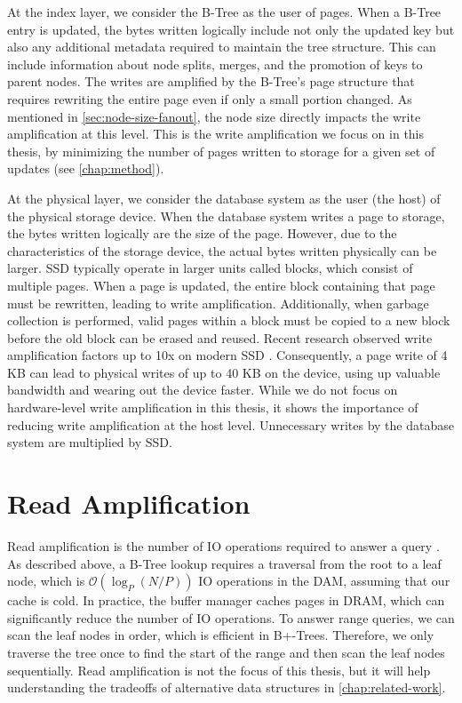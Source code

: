 At the index layer, we consider the B-Tree as the user of pages.
When a B-Tree entry is updated, the bytes written logically include not only the updated key but also any additional metadata required to maintain the tree structure.
This can include information about node splits, merges, and the promotion of keys to parent nodes.
The writes are amplified by the B-Tree's page structure that requires rewriting the entire page even if only a small portion changed.
As mentioned in \autoref{sec:node-size-fanout}, the node size directly impacts the write amplification at this level.
This is the write amplification we focus on in this thesis, by minimizing the number of pages written to storage for a given set of updates (see \autoref{chap:method}).

At the physical layer, we consider the database system as the user (the host) of the physical storage device.
When the database system writes a page to storage, the bytes written logically are the size of the page.
However, due to the characteristics of the storage device, the actual bytes written physically can be larger.
\ac{SSD} typically operate in larger units called blocks, which consist of multiple pages.
When a page is updated, the entire block containing that page must be rewritten, leading to write amplification.
Additionally, when garbage collection is performed, valid pages within a block must be copied to a new block before the old block can be erased and reused.
Recent research observed write amplification factors up to 10x on modern \ac{SSD} \cite{haas2025ssd}.
Consequently, a page write of 4 KB can lead to physical writes of up to 40 KB on the device, using up valuable bandwidth and wearing out the device faster.
While we do not focus on hardware-level write amplification in this thesis, it shows the importance of reducing write amplification at the host level.
Unnecessary writes by the database system are multiplied by \ac{SSD}.


\section{Read Amplification}
Read amplification is the number of \ac{IO} operations required to answer a query \cite{kuszmaul2014fractal}.
As described above, a B-Tree lookup requires a traversal from the root to a leaf node, which is $\mathcal{O}(\log_P(N/P))$ \ac{IO} operations in the \ac{DAM}, assuming that our cache is cold.
In practice, the buffer manager caches pages in \ac{DRAM}, which can significantly reduce the number of \ac{IO} operations.
To answer range queries, we can scan the leaf nodes in order, which is efficient in B+-Trees.
Therefore, we only traverse the tree once to find the start of the range and then scan the leaf nodes sequentially.
Read amplification is not the focus of this thesis, but it will help understanding the tradeoffs of alternative data structures in \autoref{chap:related-work}.

